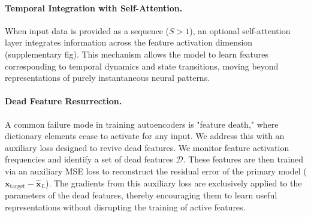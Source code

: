 \paragraph{Temporal Integration with Self-Attention.}
When input data is provided as a sequence ($S>1$), an optional self-attention layer integrates information across the feature activation dimension (supplementary fig). This mechanism allows the model to learn features corresponding to temporal dynamics and state transitions, moving beyond representations of purely instantaneous neural patterns.

\paragraph{Dead Feature Resurrection.}
A common failure mode in training autoencoders is "feature death," where dictionary elements cease to activate for any input. We address this with an auxiliary loss designed to revive dead features. We monitor feature activation frequencies and identify a set of dead features $\mathcal{D}$. These features are then trained via an auxiliary MSE loss to reconstruct the residual error of the primary model ($\mathbf{x}_{\text{target}} - \hat{\mathbf{x}}_L$). The gradients from this auxiliary loss are exclusively applied to the parameters of the dead features, thereby encouraging them to learn useful representations without disrupting the training of active features.

